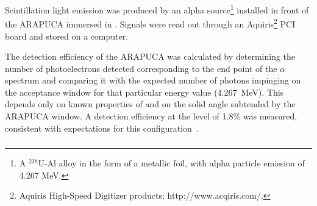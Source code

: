 Scintillation light emission was produced by an alpha source\footnote{A $^{238}$U-Al alloy in the form of a metallic foil, with alpha particle emission of 4.267 MeV.} installed in front of the ARAPUCA immersed in \lar. Signals were read out through an Aquiris\footnote{Aquiris High-Speed Digitizer products; http://www.acqiris.com/.} PCI board and stored on a computer.


The detection efficiency of the ARAPUCA was calculated by determining the number of photoelectrons detected corresponding to the end point of the $\alpha$ spectrum and comparing it with the expected number of photons impinging on the acceptance window for that  particular energy value (\SI{4.267}{MeV}).  This depends only on known properties of \lar and on the solid angle subtended by the ARAPUCA window. A detection efficiency at the level of 1.8\%  was measured, consistent with  expectations for this configuration~\cite{Marinho:2018doi}.


\subsubsection{}


